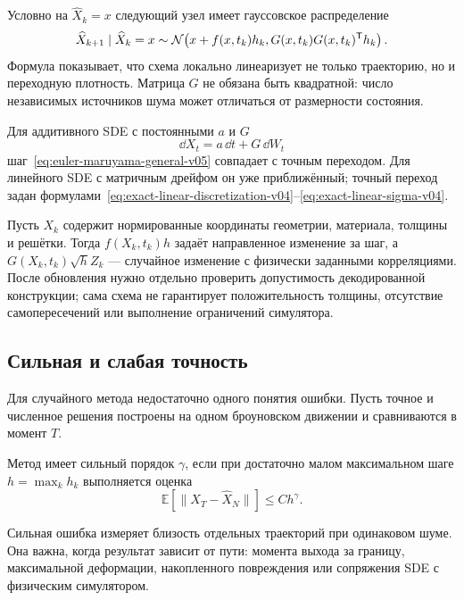Условно на $\widehat X_k=x$ следующий узел имеет гауссовское распределение
\begin{equation}
\label{eq:euler-maruyama-transition-v05}
\widehat X_{k+1}\mid \widehat X_k=x
\sim
\mathcal N\!\left(
 x+f(x,t_k)h_k,
 G(x,t_k)G(x,t_k)^{\mathsf{T}}h_k
\right).
\end{equation}
Формула показывает, что схема локально линеаризует не только траекторию, но и переходную плотность. Матрица $G$ не обязана быть квадратной: число независимых источников шума может отличаться от размерности состояния.

Для аддитивного SDE с постоянными $a$ и $G$
\[
\dd X_t=a\,\dd t+G\,\dd W_t
\]
шаг~\eqref{eq:euler-maruyama-general-v05} совпадает с точным переходом. Для линейного SDE с матричным дрейфом он уже приближённый; точный переход задан формулами~\eqref{eq:exact-linear-discretization-v04}--\eqref{eq:exact-linear-sigma-v04}.

\begin{application}
Пусть $X_k$ содержит нормированные координаты геометрии, материала, толщины и решётки. Тогда $f(X_k,t_k)h$ задаёт направленное изменение за шаг, а $G(X_k,t_k)\sqrt h Z_k$ --- случайное изменение с физически заданными корреляциями. После обновления нужно отдельно проверить допустимость декодированной конструкции; сама схема не гарантирует положительность толщины, отсутствие самопересечений или выполнение ограничений симулятора.
\end{application}

\subsection{Сильная и слабая точность}

Для случайного метода недостаточно одного понятия ошибки. Пусть точное и численное решения построены на одном броуновском движении и сравниваются в момент $T$.

\begin{definition}
Метод имеет сильный порядок $\gamma$, если при достаточно малом максимальном шаге $h=\max_k h_k$ выполняется оценка
\begin{equation}
\label{eq:strong-convergence-v05}
\mathbb E\!
\left[
\lVert X_T-\widehat X_N\rVert
\right]
\leq C h^{\gamma}.
\end{equation}
\end{definition}
Сильная ошибка измеряет близость отдельных траекторий при одинаковом шуме. Она важна, когда результат зависит от пути: момента выхода за границу, максимальной деформации, накопленного повреждения или сопряжения SDE с физическим симулятором.


